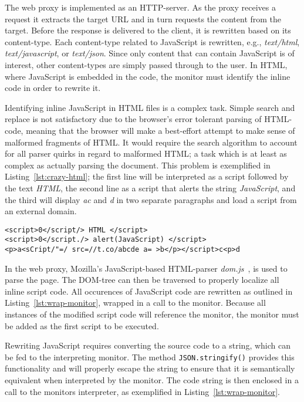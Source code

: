 \documentclass{llncs}
\begin{document}
The web proxy is implemented as an HTTP-server. As the 
proxy receives a request it extracts the target URL and in turn requests the 
content from the target. Before the response is delivered to the client, it is 
rewritten based on its content-type. Each content-type related to JavaScript is 
rewritten, e.g., \emph{text/html}, \emph{text/javascript}, or \emph{text/json}. 
Since only content that can contain JavaScript is of interest, other 
content-types are simply passed through to the user. In HTML, where 
JavaScript is embedded in the code, the monitor must identify 
the inline code in order to rewrite it.

Identifying inline JavaScript in HTML files is a complex task. 
Simple search and replace is not satisfactory due to the browser's error tolerant parsing of HTML-code, meaning that the 
browser will make a best-effort attempt to make sense of malformed fragments of 
HTML. It would require the search 
algorithm to account for all parser quirks in regard to malformed HTML;
a task which is at least as complex as actually parsing the document.
This problem is exemplified in Listing~\ref{lst:crazy-html}; the first line
will be interpreted as a script followed by the text \emph{HTML}, the second
line as a script that alerts the string \emph{JavaScript}, and the third will 
display \emph{ac} and \emph{d} in two separate paragraphs and load a script
from an external domain.

\begin{lstlisting}[language=langsmall,label=lst:crazy-html, caption=Example of complicated HTML]
<script>0</script/> HTML </script>
<script>0</script./> alert(JavaScript) </script>
<p>a<sCript/"=/ src=//t.co/abcde a= >b</p></script>c<p>d
\end{lstlisting}


In the web proxy, Mozilla's JavaScript-based HTML-parser \emph{dom.js}~\cite{Mozilla:dom.js}, is used 
to parse the page. The DOM-tree can then be traversed to properly localize 
all inline script code. All occurences of JavaScript code are rewritten as 
outlined in Listing~\ref{lst:wrap-monitor}, wrapped in a call to the monitor.
Because all instances of the modified script code will reference the monitor, 
the monitor must be added as the first script to be executed.


Rewriting JavaScript requires converting the source code to a string, which can 
be fed to the interpreting monitor. The method \lstinline{JSON.stringify()} 
provides this functionality and will properly escape the string to ensure that 
it is semantically equivalent when interpreted by the monitor. The code string is then enclosed in a call to the monitors 
interpreter, as exemplified in Listing~\ref{lst:wrap-monitor}.
\end{document}
